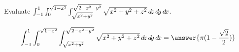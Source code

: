 \documentclass{ximera}
\author{David Guichard \and Neal Koblitz \and H. Jerome Keisler \and Albert Scheller \and Barry Balof \and Mike Wills \and Matthew Carr}
\begin{document}
\begin{exercise}




Evaluate $\int_{-1}^{1}\int_{0}^{\sqrt{1-x^2}}\int_{\sqrt{x^2+y^2}}^{\sqrt{2-x^2-y^2}}\sqrt{x^2+y^2+z^2}\mathop{}\!d\! z\mathop{}\!d\! y \mathop{}\!d\! x$.

\begin{prompt}
\[
\int_{-1}^{1}\int_{0}^{\sqrt{1-x^2}}\int_{\sqrt{x^2+y^2}}^{\sqrt{2-x^2-y^2}}\sqrt{x^2+y^2+z^2}\d z\d y \d x=\answer{\pi(1-\frac{\sqrt{2}}{2})}
\]
\end{prompt}



\end{exercise}
\end{document}
